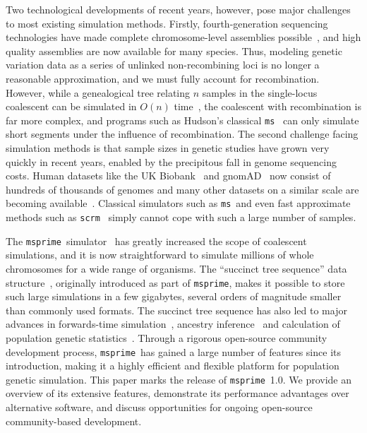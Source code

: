 \documentclass[9pt,twocolumn,twoside,lineno]{gsajnl}
\newcommand{\msprime}[0]{\texttt{msprime}}
\newcommand{\ms}[0]{\texttt{ms}}
\newcommand{\scrm}[0]{\texttt{scrm}}
\begin{document}
Two technological developments of recent years, however,
pose major challenges to most existing simulation methods.
Firstly, fourth-generation sequencing technologies have made
complete chromosome-level assemblies possible~\citep{miga2020telomere},
and high quality assemblies are now available for many species.
Thus, modeling genetic variation data as a series of unlinked
non-recombining loci
is no longer a reasonable approximation, and
we must fully account for recombination.
However, while a genealogical tree relating $n$ samples in the single-locus coalescent
can be simulated in $O(n)$ time~\citep{hudson1990gene},
the coalescent with recombination is far more complex,
and programs such as
Hudson's classical \ms~\citep{hudson2002generating}
can only simulate short segments under the influence of recombination.
The second challenge facing simulation methods is that
sample sizes in genetic studies have grown very quickly
in recent years, enabled by the precipitous fall in genome sequencing costs.
Human datasets like the
UK Biobank~\citep{bycroft2018genome} and
gnomAD~\citep{karczewski2020mutational} now consist of hundreds of
thousands of genomes and many other datasets on a similar scale
are becoming available~\citep{tanjo2021practical}.
Classical simulators such as \ms\ and even fast approximate methods
such as \scrm~\citep{staab2015scrm} simply cannot
cope with such a large number of samples.

The \msprime\ simulator~\citep{kelleher2016efficient,kelleher2020coalescent}
has greatly increased the scope of coalescent simulations,
and it is now straightforward to simulate millions of whole chromosomes
for a wide range of organisms.
The ``succinct tree sequence'' data
structure~\citep{kelleher2016efficient,kelleher2018efficient,kelleher2019inferring,
wohns2021unified},
originally introduced as part of \msprime, makes it possible to store
such large simulations in a few gigabytes, several orders
of magnitude smaller than commonly used formats.
The succinct tree sequence has also led to major advances in forwards-time
simulation~\citep{kelleher2018efficient,haller2018tree},
ancestry inference~\citep{kelleher2019inferring,wohns2021unified}
and calculation of population genetic
statistics~\citep{kelleher2016efficient,ralph2020efficiently}.
Through a rigorous open-source community development process,
\msprime\ has gained a large number of features since its introduction,
making it a highly efficient and flexible platform for population
genetic simulation.
This paper marks the release of \msprime\ 1.0.
We provide an overview of its extensive features,
demonstrate its performance advantages over alternative software,
and discuss opportunities for ongoing
open-source community-based development.
\end{document}
